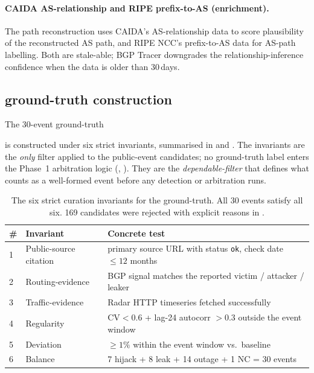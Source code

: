 \paragraph{CAIDA AS-relationship and RIPE prefix-to-AS
(enrichment).} The \ctpr{} path reconstruction uses
CAIDA's AS-relationship data \cite{caida-asrel} to score
plausibility of the reconstructed AS path, and RIPE NCC's
prefix-to-AS data for AS-path labelling. Both are
stale-able; BGP Tracer downgrades the relationship-inference
confidence when the data is older than 30\,days.

\subsection{ground-truth construction}
\label{sec:dataset-invariants}

The 30-event ground-truth

is constructed under six strict invariants, summarised in
 and . The
invariants are the \emph{only} filter applied to the
public-event candidates; no ground-truth label enters the
Phase~1 arbitration logic (,
).
They are the \emph{dependable-filter} that defines what
counts as a well-formed event before any detection or
arbitration runs.

\begin{table}[t][h]
\centering
\caption{The six strict curation invariants for the
ground-truth. All 30 events satisfy all six. 169
candidates were rejected with explicit reasons in
\protect{}.}
\label{tab:invariants}
\setlength{\tabcolsep}{3pt}
\small
\begin{tabular}{p{}p{}p{}}
\hline
\# & Invariant & Concrete test \\ \hline
1 & Public-source citation & primary source URL with status \texttt{ok}, check date $\leq 12$ months \\
2 & Routing-evidence & \rrc{} BGP signal matches the reported victim / attacker / leaker \\
3 & Traffic-evidence & \cf{} Radar HTTP timeseries fetched successfully \\
4 & Regularity & $\mathrm{CV}<0.6$ + lag-24 autocorr $>0.3$ outside the event window \\
5 & Deviation & $\geq 1\%$ within the event window vs.\ baseline \\
6 & Balance & 7 hijack + 8 leak + 14 outage + 1 NC = 30 events \\
\hline
\end{tabular}
\end{table}

